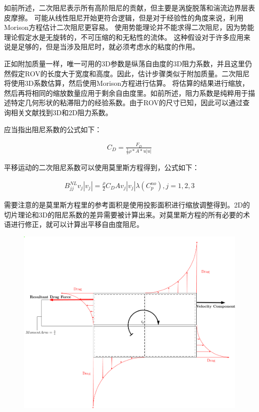 如前所述，二次阻尼表示所有高阶阻尼的贡献，但主要是涡旋脱落和湍流边界层表皮摩擦。 可能从线性阻尼开始更符合逻辑，但是对于经验性的角度来说，利用Morison方程估计二次阻尼更容易。 使用势能理论并不能求得二次阻尼，因为势能理论假定水是无旋转的，不可压缩的和无粘性的流体。 这种假设对于许多应用来说是足够的，但是当涉及阻尼时，就必须考虑水的粘度的作用。

正如附加质量一样，唯一可用的3D参数是纵荡自由度的3D阻力系数，并且这里仍然假定ROV的长度大于宽度和高度。因此，估计步骤类似于附加质量。二次阻尼将使用3D系数估算，然后使用Morison方程进行估算。 将估算的结果进行缩放，然后再将相同的缩放数量应用于剩余自由度里。如前所述，阻力系数是纯粹用于描述特定几何形状的粘滞阻力的经验系数。由于ROV的尺寸已知，因此可以通过查询相关文献找到3D和2D阻力系数\cite{eidsvik2015identification,bertram2012practical}。

应当指出阻尼系数的公式如下：

\begin{equation}
\begin{aligned}
C_D = \frac{F_D}{\frac{1}{2}\rho \ast A \ast u \left | u \right |}
\end{aligned}
\end{equation}

平移运动的二次阻尼系数可以使用莫里斯方程得到，公式如下：

\begin{equation}
\begin{aligned}
B_{jj}^{NL}v_j|v_j| = \frac{\rho}{2}C_D A v_j |v_j| \lambda(C_p^{no}), j = 1,2,3
\end{aligned}
\end{equation}

需要注意的是莫里斯方程里的参考面积是使用投影面积进行缩放调整得到。2D的切片理论和3D的阻尼系数的差异需要被计算出来。对莫里斯方程的所有必要的术语进行修正，就可以计算出平移自由度阻尼。

\begin{figure}
\label{fig:chap4:F2}
\centering
\includegraphics[width = 12cm]{figure/chap4/ROV_disc.jpg}
\end{figure}

